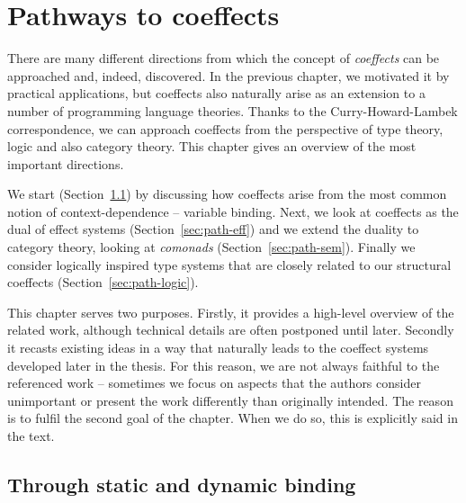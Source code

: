 \chapter{Pathways to coeffects}
\label{ch:pathways}

There are many different directions from which the concept of \emph{coeffects} can be approached
and, indeed, discovered. In the previous chapter, we motivated it by practical applications, but
coeffects also naturally arise as an extension to a number of programming language theories.
Thanks to the Curry-Howard-Lambek correspondence, we can approach coeffects from the perspective of
type theory, logic and also category theory. This chapter gives an overview of the most
important directions.

We start (Section~\ref{sec:path-binding}) by discussing how coeffects arise from the most common
notion of context-dependence -- variable binding. Next, we look at coeffects as the dual of effect
systems (Section~\ref{sec:path-eff}) and we extend the duality to category theory, looking at
\emph{comonads} (Section~\ref{sec:path-sem}). Finally we consider logically inspired type systems
that are closely related to our structural coeffects (Section~\ref{sec:path-logic}).

This chapter serves two purposes. Firstly, it provides a high-level overview of the  related work,
although technical details are often postponed until later. Secondly it recasts existing ideas in
a way that naturally leads to the coeffect systems developed later in the thesis. For this reason,
we are not always faithful to the referenced work -- sometimes we focus on aspects that the
authors consider unimportant or present the work differently than originally intended. The reason
is to fulfil the second goal of the chapter. When we do so, this is explicitly said in the text.



%
%

\section{Through static and dynamic binding}
\label{sec:path-binding}

